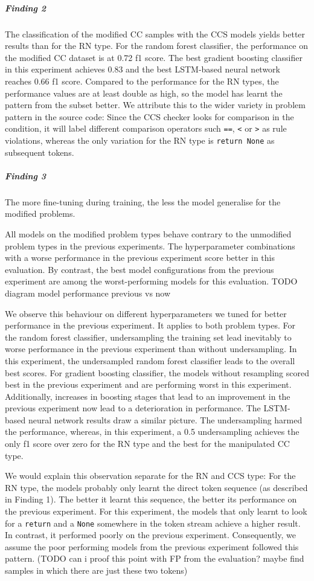 \subparagraph{Finding 2}
The classification of the modified CC samples with the CCS models yields better results than for the RN type.
For the random forest classifier, the performance on the modified CC dataset is at 0.72 f1 score. The best gradient boosting classifier in this experiment achieves 0.83 and the best LSTM-based neural network reaches 0.66 f1 score. 
Compared to the performance for the RN types, the performance values are at least double as high, so the model has learnt the pattern from the subset better. We attribute this to the wider variety in problem pattern in the source code: Since the CCS checker looks for comparison in the condition, it will label different comparison operators such \texttt{==}, \texttt{<} or \texttt{>} as rule violations, whereas the only variation for the RN type is \texttt{return None} as subsequent tokens.

\subparagraph{Finding 3}\label{finding:better_vs_worse}
The more fine-tuning during training, the less the model generalise for the modified problems.

All models on the modified problem types behave contrary to the unmodified problem types in the previous experiments. The hyperparameter combinations with a worse performance in the previous experiment score better in this evaluation. By contrast, the best model configurations from the previous experiment are among the worst-performing models for this evaluation.  
TODO diagram model performance previous vs now

We observe this behaviour on different hyperparameters we tuned for better performance in the previous experiment. It applies to both problem types.
For the random forest classifier, undersampling the training set lead inevitably to worse performance in the previous experiment than without undersampling. In this experiment, the undersampled random forest classifier leads to the overall best scores. For gradient boosting classifier, the models without resampling scored best in the previous experiment and are performing worst in this experiment. Additionally, increases in boosting stages that lead to an improvement in the previous experiment now lead to a deterioration in performance. 
The LSTM-based neural network results draw a similar picture. The undersampling harmed the performance, whereas, in this experiment, a 0.5 undersampling achieves the only f1 score over zero for the RN type and the best for the manipulated CC type.

We would explain this observation separate for the RN and CCS type:
For the RN type, the models probably only learnt the direct token sequence (as described in Finding 1). The better it learnt this sequence, the better its performance on the previous experiment. For this experiment, the models that only learnt to look for a \texttt{return} and a \texttt{None} somewhere in the token stream achieve a higher result. In contrast, it performed poorly on the previous experiment. Consequently,  we assume the poor performing models from the previous experiment followed this pattern. (TODO can i proof this point with FP from the evaluation? maybe find samples in which there are just these two tokens)

